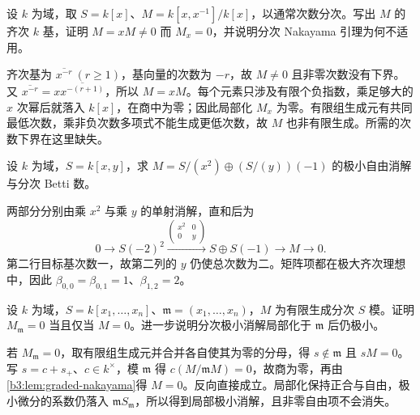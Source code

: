 \begin{exercise}\label{b3:ex:21-nakayama-bound}
	设 \(k\) 为域，取 \(S=k[x]\)、\(M=k[x,x^{-1}]/k[x]\)，以通常次数分次。写出 \(M\) 的齐次 \(k\) 基，证明 \(M=xM\ne0\) 而 \(M_x=0\)，并说明分次 Nakayama 引理为何不适用。
\end{exercise}
\begin{solution}
	齐次基为 \(\overline{x^{-r}}\ (r\ge1)\)，基向量的次数为 \(-r\)，故 \(M\ne0\) 且非零次数没有下界。又 \(\overline{x^{-r}}=x\overline{x^{-(r+1)}}\)，所以 \(M=xM\)。每个元素只涉及有限个负指数，乘足够大的 \(x\) 次幂后就落入 \(k[x]\)，在商中为零；因此局部化 \(M_x\) 为零。有限组生成元有共同最低次数，乘非负次数多项式不能生成更低次数，故 \(M\) 也非有限生成。所需的次数下界在这里缺失。
\end{solution}

\begin{exercise}\label{b3:ex:21-direct-sum-shifts}
	设 \(k\) 为域，\(S=k[x,y]\)，求 \(M=S/(x^2)\oplus (S/(y))(-1)\) 的极小自由消解与分次 Betti 数。
\end{exercise}
\begin{solution}
	两部分分别由乘 \(x^2\) 与乘 \(y\) 的单射消解，直和后为
	\[
		0\rightarrow S(-2)^2\xrightarrow{\left(\begin{smallmatrix}x^2&0\\0&y\end{smallmatrix}\right)}
		S\oplus S(-1)\rightarrow M\rightarrow0.
	\]
	第二行目标基次数一，故第二列的 \(y\) 仍使总次数为二。矩阵项都在极大齐次理想中，因此 \(\beta_{0,0}=\beta_{0,1}=1\)、\(\beta_{1,2}=2\)。
\end{solution}

\begin{exercise}\label{b3:ex:21-detect-localization}
	设 \(k\) 为域，\(S=k[x_1,\ldots,x_n]\)、\(\mathfrak m=(x_1,\ldots,x_n)\)，\(M\) 为有限生成分次 \(S\) 模。证明 \(M_{\mathfrak m}=0\) 当且仅当 \(M=0\)。进一步说明分次极小消解局部化于 \(\mathfrak m\) 后仍极小。
\end{exercise}
\begin{solution}
	若 \(M_{\mathfrak m}=0\)，取有限组生成元并合并各自使其为零的分母，得 \(s\notin\mathfrak m\) 且 \(sM=0\)。写 \(s=c+s_+\)、\(c\in k^\times\)，模 \(\mathfrak m\) 得 \(c(M/\mathfrak mM)=0\)，故商为零，再由\cref{b3:lem:graded-nakayama}得 \(M=0\)。反向直接成立。局部化保持正合与自由，极小微分的系数仍落入 \(\mathfrak mS_{\mathfrak m}\)，所以得到局部极小消解，且非零自由项不会消失。
\end{solution}

